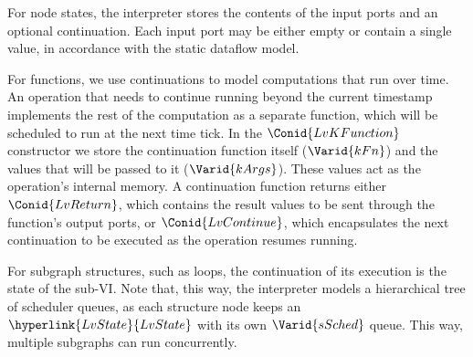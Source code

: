 For node states, the interpreter stores the contents of the input ports and an
optional continuation. Each input port may be either empty or contain a single
value, in accordance with the static dataflow model.

\resethooks

For functions, we use continuations to model computations that run over time.
An operation that needs to continue running beyond the current timestamp
implements the rest of the computation as a separate function, which will be
scheduled to run at the next time tick. In the \ensuremath{\Conid{LvKFunction}} constructor we
store the continuation function itself (\ensuremath{\Varid{kFn}}) and the values that will be
passed to it (\ensuremath{\Varid{kArgs}}). These values act as the operation's internal memory.
A continuation function returns either \ensuremath{\Conid{LvReturn}}, which contains the result
values to be sent through the function's output ports, or \ensuremath{\Conid{LvContinue}}, which
encapsulates the next continuation to be executed as the operation resumes
running.

For subgraph structures, such as loops, the continuation of its execution is
the state of the sub-VI. Note that, this way, the interpreter models a
hierarchical tree of scheduler queues, as each structure node keeps an
\ensuremath{\hyperlink{LvState}{LvState}} with its own \ensuremath{\Varid{sSched}} queue. This way, multiple subgraphs can run
concurrently.

